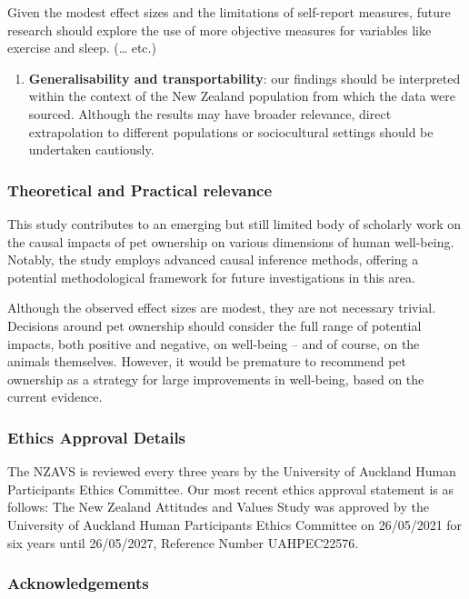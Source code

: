 \documentclass[
  singlecolumn,
  9pt]{article}
\providecommand{\tightlist}{%
  \setlength{\itemsep}{0pt}\setlength{\parskip}{0pt}}\usepackage{longtable,booktabs,array}
\begin{document}
Given the modest effect sizes and the limitations of self-report
measures, future research should explore the use of more objective
measures for variables like exercise and sleep. (\ldots{} etc.)

\begin{enumerate}
\def\labelenumi{\arabic{enumi}.}
\setcounter{enumi}{2}
\tightlist
\item
  \textbf{Generalisability and transportability}: our findings should be
  interpreted within the context of the New Zealand population from
  which the data were sourced. Although the results may have broader
  relevance, direct extrapolation to different populations or
  sociocultural settings should be undertaken cautiously.
\end{enumerate}

\subsubsection{Theoretical and Practical
relevance}\label{theoretical-and-practical-relevance}

This study contributes to an emerging but still limited body of
scholarly work on the causal impacts of pet ownership on various
dimensions of human well-being. Notably, the study employs advanced
causal inference methods, offering a potential methodological framework
for future investigations in this area.

Although the observed effect sizes are modest, they are not necessary
trivial. Decisions around pet ownership should consider the full range
of potential impacts, both positive and negative, on well-being -- and
of course, on the animals themselves. However, it would be premature to
recommend pet ownership as a strategy for large improvements in
well-being, based on the current evidence.

\subsubsection{Ethics Approval Details}\label{ethics-approval-details}

The NZAVS is reviewed every three years by the University of Auckland
Human Participants Ethics Committee. Our most recent ethics approval
statement is as follows: The New Zealand Attitudes and Values Study was
approved by the University of Auckland Human Participants Ethics
Committee on 26/05/2021 for six years until 26/05/2027, Reference Number
UAHPEC22576.

\subsubsection{Acknowledgements}\label{acknowledgements}
\end{document}
